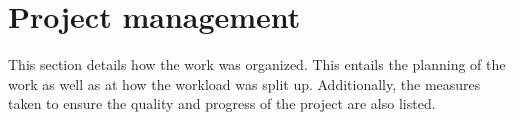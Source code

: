 \section{Project management}
This section details how the work was organized. This entails the planning of the work as well as at how the workload was split up. Additionally, the measures taken to ensure the quality and progress of the project are also listed. 








